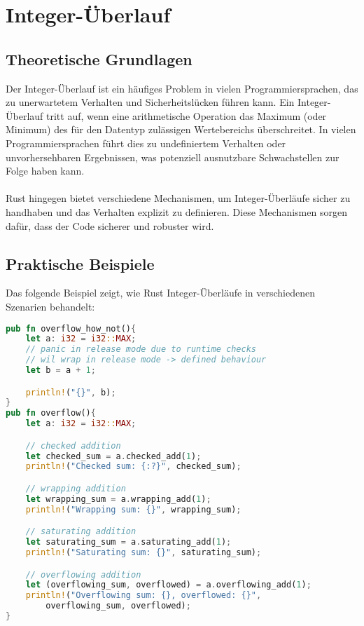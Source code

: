 \chapter{Integer-Überlauf}

\section{Theoretische Grundlagen}

Der Integer-Überlauf ist ein häufiges Problem in vielen Programmiersprachen, das zu unerwartetem Verhalten und Sicherheitslücken führen kann. 
Ein Integer-Überlauf tritt auf, wenn eine arithmetische Operation das Maximum (oder Minimum) des für den Datentyp zulässigen Wertebereichs überschreitet. 
In vielen Programmiersprachen führt dies zu undefiniertem Verhalten oder unvorhersehbaren Ergebnissen, was potenziell ausnutzbare Schwachstellen zur Folge haben kann.\\
\\
Rust hingegen bietet verschiedene Mechanismen, um Integer-Überläufe sicher zu handhaben und das Verhalten explizit zu definieren. 
Diese Mechanismen sorgen dafür, dass der Code sicherer und robuster wird.

\section{Praktische Beispiele}

Das folgende Beispiel zeigt, wie Rust Integer-Überläufe in verschiedenen Szenarien behandelt:

\begin{lstlisting}[language=Rust, caption=Beispielcode zur Behandlung von Integer-Überläufen in Rust]
pub fn overflow_how_not(){
    let a: i32 = i32::MAX;
    // panic in release mode due to runtime checks
    // wil wrap in release mode -> defined behaviour
    let b = a + 1;  

    println!("{}", b);
}
pub fn overflow(){
    let a: i32 = i32::MAX;

    // checked addition 
    let checked_sum = a.checked_add(1);
    println!("Checked sum: {:?}", checked_sum);  

    // wrapping addition 
    let wrapping_sum = a.wrapping_add(1);
    println!("Wrapping sum: {}", wrapping_sum);  

    // saturating addition 
    let saturating_sum = a.saturating_add(1);
    println!("Saturating sum: {}", saturating_sum);  

    // overflowing addition 
    let (overflowing_sum, overflowed) = a.overflowing_add(1);
    println!("Overflowing sum: {}, overflowed: {}",
        overflowing_sum, overflowed);  
}
\end{lstlisting}

